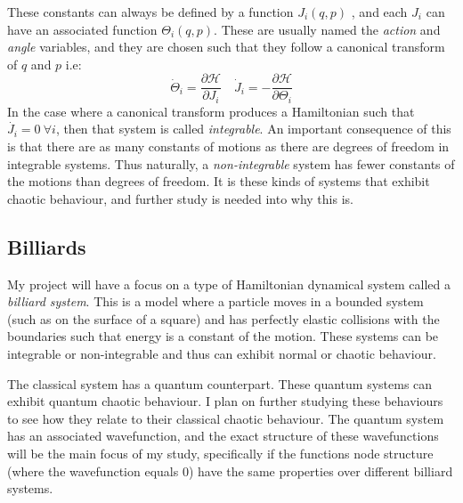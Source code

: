 \documentclass[12pt,a4paper]{amsart}
\begin{document}
These constants can always be defined by a function $J_{i}(q, p)$ \cite{HILBORN}, and each $J_{i}$ can have an associated function $\Theta_{i}(q, p)$. These are usually named the \textit{action} and \textit{angle} variables, and they are chosen such that they follow a canonical transform of $q$ and $p$ i.e:
$$\dot{\Theta}_{i} = \frac{\partial \mathcal{H}}{\partial J_{i}} \quad \dot{J}_{i} = -\frac{\partial \mathcal{H}}{\partial \Theta_{i}}$$
In the case where a canonical transform produces a Hamiltonian such that $\dot{J_{i}} = 0 \ \forall i$, then that system is called \textit{integrable}. An important consequence of this is that there are as many constants of motions as there are degrees of freedom in integrable systems. Thus naturally, a \textit{non-integrable} system has fewer constants of the motions than degrees of freedom. It is these kinds of systems that exhibit chaotic behaviour, and further study is needed into why this is.

 

\subsection{Billiards}

My project will have a focus on a type of Hamiltonian dynamical system called a \textit{billiard system}. This is a model where a particle moves in a bounded system (such as on the surface of a square) and has perfectly elastic collisions with the boundaries such that energy is a constant of the motion. These systems can be integrable or non-integrable and thus can exhibit normal or chaotic behaviour. 

The classical system has a quantum counterpart. These quantum systems can exhibit quantum chaotic behaviour. I plan on further studying these behaviours to see how they relate to their classical chaotic behaviour. The quantum system has an associated wavefunction, and the exact structure of these wavefunctions will be the main focus of my study, specifically if the functions node structure (where the wavefunction equals 0) have the same properties over different billiard systems.

\end{document}
